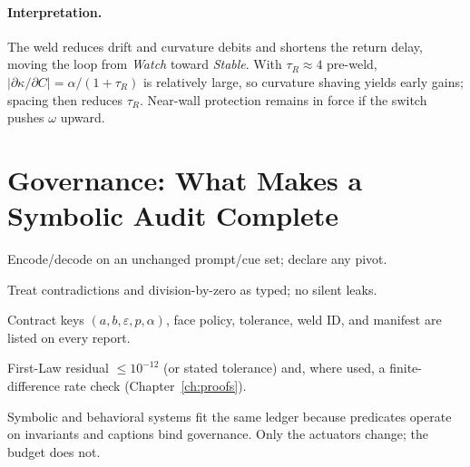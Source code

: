 \paragraph{Interpretation.}
The weld reduces drift and curvature debits and shortens the return delay, moving the loop from \emph{Watch} toward \emph{Stable}. With \(\tau_R\!\approx\!4\) pre-weld, \(|\partial\kappa/\partial C|=\alpha/(1+\tau_R)\) is relatively large, so curvature shaving yields early gains; spacing then reduces \(\tau_R\). Near-wall protection remains in force if the switch pushes \(\omega\) upward.

\section{Governance: What Makes a Symbolic Audit Complete}
\begin{description}[leftmargin=1.2em,labelindent=0em,style=nextline]
  \item[Same anchor] Encode/decode on an unchanged prompt/cue set; declare any pivot.
  \item[Typed outcomes] Treat contradictions and division-by-zero as typed; no silent leaks.
  \item[Caption discipline] Contract keys \((a,b,\varepsilon,p,\alpha)\), face policy, tolerance, weld ID, and manifest are listed on every report.
  \item[Residuals] First-Law residual \(\le 10^{-12}\) (or stated tolerance) and, where used, a finite-difference rate check (Chapter~\ref{ch:proofs}).
\end{description}

\medskip
\noindent
Symbolic and behavioral systems fit the same ledger because predicates operate on invariants and captions bind governance. Only the actuators change; the budget does not.
